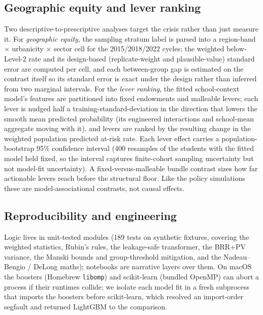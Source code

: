 \subsection{Geographic equity and lever ranking}
Two descriptive-to-prescriptive analyses target the crisis rather than just measure it.
For \emph{geographic equity}, the sampling stratum label is parsed into a
region-band $\times$ urbanicity $\times$ sector cell for the 2015/2018/2022 cycles; the
weighted below-Level-2 rate and its design-based (replicate-weight and plausible-value)
standard error are computed per cell, and each between-group gap is estimated on the
contrast itself so its standard error is exact under the design rather than inferred from
two marginal intervals. For the \emph{lever ranking}, the fitted school-context model's
features are partitioned into fixed endowments and malleable levers; each lever is nudged
half a training-standard-deviation in the direction that lowers the smooth mean predicted
probability (its engineered interactions and school-mean aggregate moving with it), and
levers are ranked by the resulting change in the weighted population predicted at-risk
rate. Each lever effect carries a population-bootstrap 95\% confidence interval (400
resamples of the students with the fitted model held fixed, so the interval captures
finite-cohort sampling uncertainty but not model-fit uncertainty). A fixed-versus-malleable
bundle contrast sizes how far actionable levers reach before the structural floor. Like the
policy simulations these are model-associational contrasts, not causal effects.

\subsection{Reproducibility and engineering}
Logic lives in unit-tested modules (189 tests on synthetic fixtures, covering the
weighted statistics, Rubin's rules, the leakage-safe transformer, the BRR+PV variance,
the Manski bounds and group-threshold mitigation, and the Nadeau--Bengio / DeLong
maths); notebooks are narrative layers over them. On
macOS the boosters (Homebrew \texttt{libomp}) and scikit-learn (bundled OpenMP) can
abort a process if their runtimes collide; we isolate each model fit in a fresh
subprocess that imports the boosters before scikit-learn, which resolved an
import-order segfault and returned LightGBM to the comparison.
